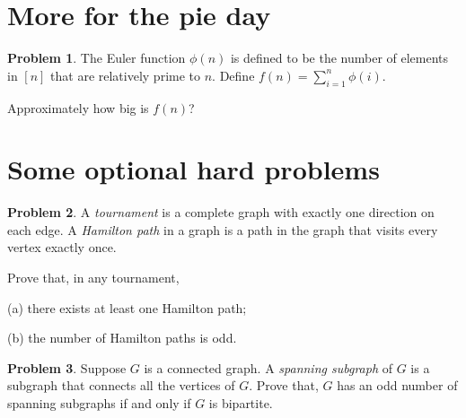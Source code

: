 \documentclass[12pt]{article}
\theoremstyle{definition}
\newtheorem{hw}{Problem}
\begin{document}
\section{More for the pie day}

\begin{hw}
The Euler function $\phi(n)$ is defined to be the number of elements
in $[n]$ that are relatively prime to $n$. Define $f(n)= \sum_{i=1}^n
\phi(i)$.

Approximately how big is $f(n)$?
\end{hw}

\section{Some optional hard problems}

\begin{hw}
A {\em tournament} is a complete graph with exactly one direction on
each edge.
A {\em Hamilton path} in a graph is a path in the graph that visits
every vertex exactly once.

Prove that, in any tournament,

(a) there exists at least one Hamilton path;

(b) the number of Hamilton paths is odd.

\end{hw}

\begin{hw}
Suppose $G$ is a connected graph. A {\em spanning subgraph} of $G$ is
a subgraph that connects all the vertices of $G$. Prove that,
$G$ has an odd number of spanning subgraphs if and only if
$G$ is bipartite.
\end{hw}
\end{document}
